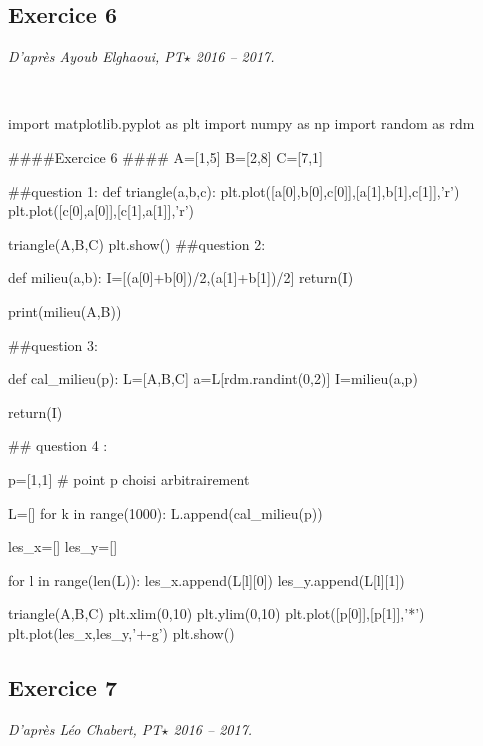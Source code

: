 \documentclass[10pt,fleqn]{article} %
\begin{document}
\subsection*{Exercice 6}
\textit{D'après Ayoub Elghaoui, PT$\star$ 2016 -- 2017.}

\begin{corrige}
$\quad$
\begin{python}
import matplotlib.pyplot as plt
import numpy as np
import random as rdm

####Exercice 6 ####
A=[1,5]
B=[2,8]
C=[7,1]

##question 1:
def triangle(a,b,c):
    plt.plot([a[0],b[0],c[0]],[a[1],b[1],c[1]],'r')
        plt.plot([c[0],a[0]],[c[1],a[1]],'r')

triangle(A,B,C)
plt.show()
##question 2:

def milieu(a,b):
    I=[(a[0]+b[0])/2,(a[1]+b[1])/2]
    return(I)

print(milieu(A,B))

##question 3:

def cal_milieu(p):
    L=[A,B,C]
    a=L[rdm.randint(0,2)]
    I=milieu(a,p)
    
    return(I)

## question 4 :

p=[1,1] # point p choisi arbitrairement

L=[]
for k in range(1000):
    L.append(cal_milieu(p))

les_x=[]
les_y=[]

for l in range(len(L)):
    les_x.append(L[l][0])
    les_y.append(L[l][1])

triangle(A,B,C)
plt.xlim(0,10)
plt.ylim(0,10)
plt.plot([p[0]],[p[1]],'*')
plt.plot(les_x,les_y,'+-g')
plt.show()
\end{python}
\end{corrige}

\subsection*{Exercice 7}
\textit{D'après Léo Chabert, PT$\star$ 2016 -- 2017.}
\end{document}

